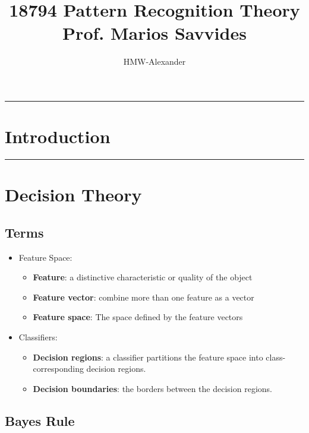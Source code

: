 \documentclass[letterpaper,10pt]{article}
\title{\textbf{18794 Pattern Recognition Theory\\Prof. Marios Savvides}}
\author{HMW-Alexander}
\begin{document}
	
\maketitle

\tableofcontents

\begin{center}\rule{\textwidth}{1pt}\end{center}
\section{Introduction}

\begin{center}\rule{\textwidth}{1pt}\end{center}
\section{Decision Theory}

\subsection{Terms}

\begin{itemize}
	\item Feature Space:
	\begin{itemize}
		\item \textbf{Feature}: a distinctive characteristic or quality of the object
		\item \textbf{Feature vector}: combine more than one feature as a vector
		\item \textbf{Feature space}: The space defined by the feature vectors
	\end{itemize}
	\item Classifiers:
	\begin{itemize}
		\item \textbf{Decision regions}: a classifier partitions the feature space into class-corresponding decision regions.
		\item \textbf{Decision boundaries}: the borders between the decision regions.
	\end{itemize}
\end{itemize}

\subsection{Bayes Rule}
\end{document}

